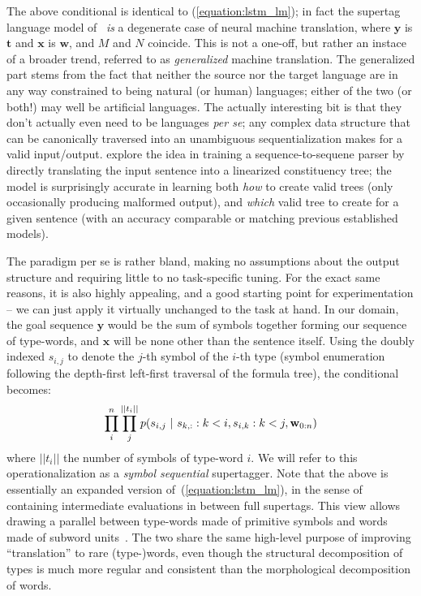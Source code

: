 The above conditional is identical to (\ref{equation:lstm_lm}); in fact the supertag language model of~\citet{vaswani-etal-2016-supertagging} \textit{is} a degenerate case of neural machine translation, where $\mathbf{y}$ is $\mathbf{t}$ and $\mathbf{x}$ is $\mathbf{w}$, and $M$ and $N$ coincide.
This is not a one-off, but rather an instace of a broader trend, referred to as \textit{generalized} machine translation.
The generalized part stems from the fact that neither the source nor the target language are in any way constrained to being natural (or human) languages; either of the two (or both!) may well be artificial languages.
The actually interesting bit is that they don't actually even need to be languages \textit{per se}; any complex data structure that can be canonically traversed into an unambiguous sequentialization makes for a valid input/output.
\citet{vinyals2015grammar} explore the idea in training a sequence-to-sequene parser by directly translating the input sentence into a linearized constituency tree; the model is surprisingly accurate in learning both \textit{how} to create valid trees (only occasionally producing malformed output), and \textit{which} valid tree to create for a given sentence (with an accuracy comparable or matching previous established models).

The paradigm per se is rather bland, making no assumptions about the output structure and requiring little to no task-specific tuning.
For the exact same reasons, it is also highly appealing, and a good starting point for experimentation -- we can just apply it virtually unchanged to the task at hand.
In our domain, the goal sequence $\mathbf{y}$ would be the sum of symbols together forming our sequence of type-words, and $\mathbf{x}$ will be none other than the sentence itself.
Using the doubly indexed $s_{i,j}$ to denote the $j$-th symbol of the $i$-th type (symbol enumeration following the depth-first left-first traversal of the formula tree), the conditional becomes:
\begin{equation}
	\prod_i^n \prod_j^{|| t_i ||} 
	p(s_{i, j} \ | \ 
		s_{k, :} : k < i,
		s_{i, k} : k < j,
		\wseq)
\end{equation}
where $||t_i||$ the number of symbols of type-word $i$.
We will refer to this operationalization as a \textit{symbol sequential} supertagger.
Note that the above is essentially an expanded version of~(\ref{equation:lstm_lm}), in the sense of containing intermediate evaluations in between full supertags.
This view allows drawing a parallel between type-words made of primitive symbols and words made of subword units~\cite{sennrich-etal-2016-neural}. The two share the same high-level purpose of improving ``translation'' to rare (type-)words, even though the structural decomposition of types is much more regular and consistent than the morphological decomposition of words.

